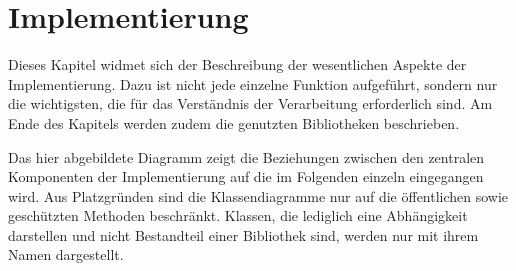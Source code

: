 \chapter{Implementierung}
\writtenby{\dcauthornameriren}%
Dieses Kapitel widmet sich der Beschreibung der wesentlichen Aspekte der Implementierung.
Dazu ist nicht jede einzelne Funktion aufgeführt, sondern nur die wichtigsten, die für das Verständnis der Verarbeitung erforderlich sind.
Am Ende des Kapitels werden zudem die genutzten Bibliotheken beschrieben.

Das hier abgebildete Diagramm zeigt die Beziehungen zwischen den zentralen Komponenten der Implementierung auf die im Folgenden einzeln eingegangen wird.
Aus Platzgründen sind die Klassendiagramme nur auf die öffentlichen sowie geschützten Methoden beschränkt.
Klassen, die lediglich eine Abhängigkeit darstellen und nicht Bestandteil einer Bibliothek sind, werden nur mit ihrem Namen dargestellt.













